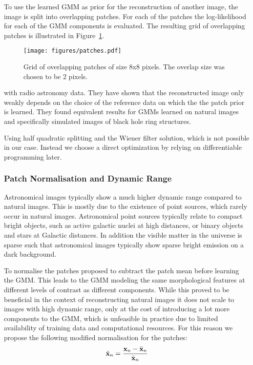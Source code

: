 \documentclass[twocolumn]{aastex631}
\begin{document}
    To use the learned GMM as prior for the reconstruction of another image, the image is split into overlapping patches. For each of the patches the log-likelihood for each of the GMM components is evaluated. The resulting grid of overlapping patches is illustrated in Figure~\ref{fig:patches}.

    \begin{figure}
        \begin{centering}
            \texttt{[image: figures/patches.pdf]}
            \caption{
                Grid of overlapping patches of size 8x8 pixels. The overlap size was chosen to be 2 pixels.
            }
            \label{fig:patches}
        \end{centering}
    \end{figure}

    with radio astronomy data. They have shown that the reconstructed image only weakly depends on the choice of the reference data on which the the patch prior is learned. They found equivalent results for GMMs learned on natural images and specifically simulated images of black hole ring structures.

    Using half quadratic splitting and the Wiener filter solution, which is not possible in our case. Instead we choose a direct optimization by relying on differentiable programming later. 
    

    \subsubsection{Patch Normalisation and Dynamic Range}
    Astronomical images typically show a much higher dynamic range compared to natural images. This is mostly due to the existence of point sources, which rarely occur in natural images. Astronomical point sources typically relate to compact bright objects, such as active galactic nuclei at high distances, or binary objects and stars at Galactic distances. In addition the visible matter in the universe is sparse such that astronomical images typically show sparse bright emission on a dark background. 

    To normalise the patches \cite{Zoran2011} proposed to subtract the patch mean before learning the GMM. This leads to the GMM modeling the same morphological features at different levels of contrast as different components. While this proved to be beneficial in the context of reconstructing natural images it does not scale to images with high dynamic range, only at the cost of introducing a lot more components to the GMM, which is unfeasible in practice due to limited availability of training data and computational resources. For this reason we propose the following modified normalisation for the patches:
    \begin{equation}
        \label{eq:patch-norm}
        \tilde{\mathbf{x}}_n = \frac{\mathbf{x}_n - \Bar{\mathbf{x}}_n}{\Bar{\mathbf{x}}_n}
    \end{equation}
    
\end{document}
